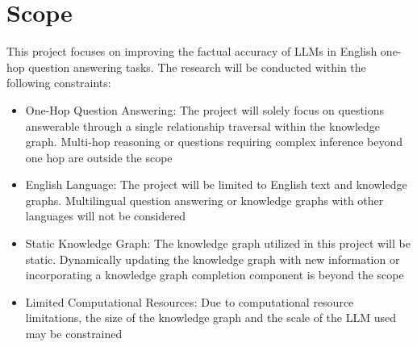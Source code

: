 \section{Scope}
This project focuses on improving the factual accuracy of LLMs in English one-hop question answering tasks. The research will be conducted within the following constraints:
\begin{itemize}
\item One-Hop Question Answering: The project will solely focus on questions answerable through a single relationship traversal within the knowledge graph. Multi-hop reasoning or questions requiring complex inference beyond one hop are outside the scope
\item English Language: The project will be limited to English text and knowledge graphs. Multilingual question answering or knowledge graphs with other languages will not be considered
\item Static Knowledge Graph: The knowledge graph utilized in this project will be static. Dynamically updating the knowledge graph with new information or incorporating a knowledge graph completion component is beyond the scope
\item Limited Computational Resources: Due to computational resource limitations, the size of the knowledge graph and the scale of the LLM used may be constrained
\end{itemize}